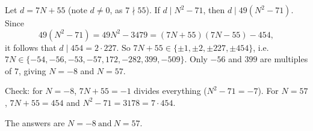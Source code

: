 Let $d=7N+55$ (note $d\ne0$, as $7\nmid55$). If $d\mid N^2-71$, then $d\mid49(N^2-71)$. Since
\[
49(N^2-71)=49N^2-3479=(7N+55)(7N-55)-454 ,
\]
it follows that $d\mid454=2\cdot227$. So $7N+55\in\{\pm1,\pm2,\pm227,\pm454\}$, i.e.\ $7N\in\{-54,-56,-53,-57,172,-282,399,-509\}$. Only $-56$ and $399$ are multiples of $7$, giving $N=-8$ and $N=57$.

Check: for $N=-8$, $7N+55=-1$ divides everything ($N^2-71=-7$). For $N=57$, $7N+55=454$ and $N^2-71=3178=7\cdot454$.

The answers are $\boxed{N=-8\ \text{and}\ N=57}$.
